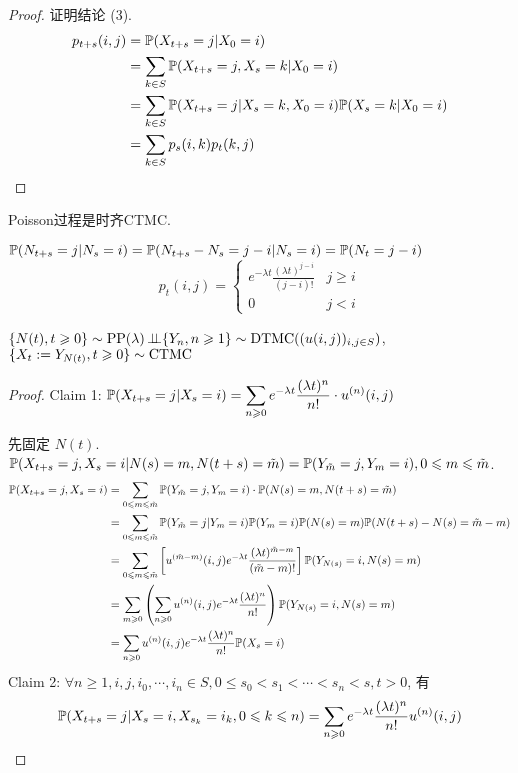 \begin{proof}
    证明结论 (3).
    \[
    \begin{aligned}
        p_{t+s}(i,j) &=\mathbb{P}(X_{t+s}=j|X_0=i)\\
        &=\sum_{k\in S}\mathbb{P}(X_{t+s}=j,X_s=k|X_0=i)\\
        &=\sum_{k\in S}\mathbb{P}(X_{t+s}=j|X_s=k,X_0=i)\mathbb{P}(X_s=k|X_0=i)\\
        &=\sum_{k\in S}p_s(i,k)p_t(k,j)
    \end{aligned}
    \]
\end{proof}

\begin{example}
    Poisson过程是时齐CTMC.

    $\mathbb{P}(N_{t+s}=j|N_s=i)=\mathbb{P}(N_{t+s}-N_s=j-i|N_s=i)=\mathbb{P}(N_t=j-i)$
    \[
    p_t(i,j)=\begin{cases}
        e^{-\lambda t}\frac{(\lambda t)^{j-i}}{(j-i)!} & j\geq i\\
        0 & j<i
    \end{cases}
    \]
\end{example}

\begin{example}
    $\{N(t),t\geqslant 0\}\sim \operatorname{PP}(\lambda)\operatorname{\perp\!\!\!\perp} \{Y_n,n\geqslant 1\}\sim \operatorname{DTMC}((u(i,j))_{i,j\in S})$, $\{X_t:=Y_{N(t)},t\geqslant 0\}\sim\operatorname{CTMC}$
\end{example}

\begin{proof}
    Claim 1: $\displaystyle\mathbb{P}(X_{t+s}=j|X_s=i)=\sum_{n\geqslant 0}e^{-\lambda t}\frac{(\lambda t)^n}{n!}\cdot u^{(n)}(i,j)$

    先固定 $N(t)$. $\mathbb{P}(X_{t+s}=j,X_s=i|N(s)=m,N(t+s)=\tilde{m})=\mathbb{P}(Y_{\tilde{m}}=j,Y_m=i), 0\leqslant m\leqslant \tilde{m}$.
    \[
    \begin{aligned}
        \mathbb{P}(X_{t+s}=j,X_s=i)&=\sum_{0\leqslant m\leqslant \tilde{m}}
        \mathbb{P}(Y_{\tilde{m}}=j,Y_m=i)\cdot 
        \mathbb{P}(N(s)=m,N(t+s)=\tilde{m})\\
        &=\sum_{0\leqslant m\leqslant \tilde{m}}
        \mathbb{P}(Y_{\tilde{m}}=j|Y_m=i)\mathbb{P}(Y_m=i)
        \mathbb{P}(N(s)=m)\mathbb{P}(N(t+s)-N(s)=\tilde{m}-m)\\
        &=\sum_{0\leqslant m\leqslant \tilde{m}}
        \left[
            u^{(\tilde{m}-m)}(i,j) e^{-\lambda t}\frac{(\lambda t)^{\tilde{m}-m}}{(\tilde{m}-m)!}
        \right]
        \mathbb{P}(Y_{N(s)}=i,N(s)=m)\\
        &=\sum_{m\geqslant 0}
        \left(
            \sum_{n\geqslant 0}u^{(n)}(i,j)e^{-\lambda t}\frac{(\lambda t)^{n}}{n!}
        \right)
        \mathbb{P}(Y_{N(s)}=i,N(s)=m)\\
        &=\sum_{n\geqslant 0}u^{(n)}(i,j)e^{-\lambda t}\frac{(\lambda t)^{n}}{n!}\mathbb{P}(X_s=i)
    \end{aligned}
    \]
    Claim 2: $\forall n\geq 1, i,j,i_0,\cdots,i_n\in S,0\leq s_0<s_1<\cdots<s_n<s,t>0$, 有
    \[
    \mathbb{P}(X_{t+s}=j|X_s=i,X_{s_k}=i_k,0\leqslant k\leqslant n)
    =\sum_{n\geqslant 0}e^{-\lambda t}\frac{(\lambda t)^n}{n!}u^{(n)}(i,j)
    \]
\end{proof}
\newpage